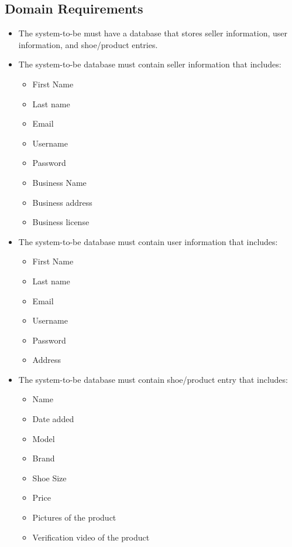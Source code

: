 \subsection{Domain Requirements}
\begin{itemize}
  \item The system-to-be must have a database that stores seller information, user information, and shoe/product entries.
  \item The system-to-be database must contain seller information that includes:
        \begin{itemize}
          \item First Name
          \item Last name
          \item Email
          \item Username
          \item Password
          \item Business Name
          \item Business address
          \item Business license
        \end{itemize}
  \item The system-to-be database must contain user information that includes:
      \begin{itemize}
          \item First Name
          \item Last name
          \item Email
          \item Username
          \item Password
          \item Address
      \end{itemize}
  \item The system-to-be database must contain shoe/product entry that includes:
        \begin{itemize}
          \item Name
          \item Date added
          \item Model
          \item Brand
          \item Shoe Size
          \item Price
          \item Pictures of the product
          \item Verification video of the product
        \end{itemize}

\end{itemize}
